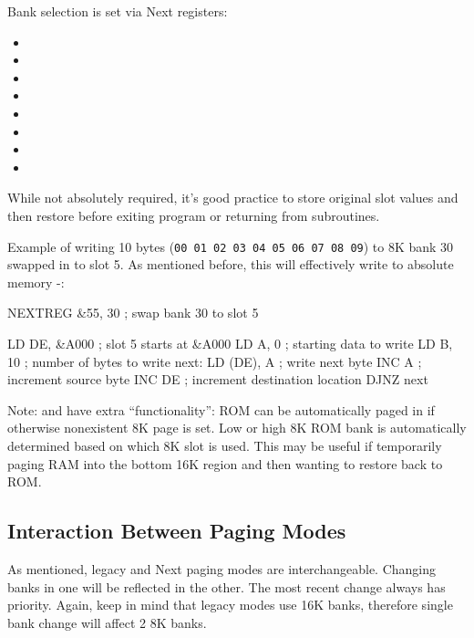 Bank selection is set via Next registers:

\begin{itemize}[topsep=0pt,itemsep=0pt]
	\item {}
	\item {}
	\item {}
	\item {}
	\item {}
	\item {}
	\item {}
	\item {}
\end{itemize}

While not absolutely required, it's good practice to store original slot values and then restore before exiting program or returning from subroutines.

Example of writing 10 bytes ({\tt 00 01 02 03 04 05 06 07 08 09}) to 8K bank 30 swapped in to slot 5. As mentioned before, this will effectively write to absolute memory -:

\begin{tcblisting}{}
	NEXTREG &55, 30     ; swap bank 30 to slot 5

	LD DE, &A000        ; slot 5 starts at &A000
	LD A, 0             ; starting data to write
	LD B, 10            ; number of bytes to write
next:
	LD (DE), A          ; write next byte
	INC A               ; increment source byte
	INC DE              ; increment destination location
	DJNZ next
\end{tcblisting}

Note:  and  have extra ``functionality'': ROM can be automatically paged in if otherwise nonexistent 8K page  is set. Low or high 8K ROM bank is automatically determined based on which 8K slot is used. This may be useful if temporarily paging RAM into the bottom 16K region and then wanting to restore back to ROM.


\subsection{Interaction Between Paging Modes}

As mentioned, legacy and Next paging modes are interchangeable. Changing banks in one will be reflected in the other. The most recent change always has priority. Again, keep in mind that legacy modes use 16K banks, therefore single bank change will affect 2 8K banks.


